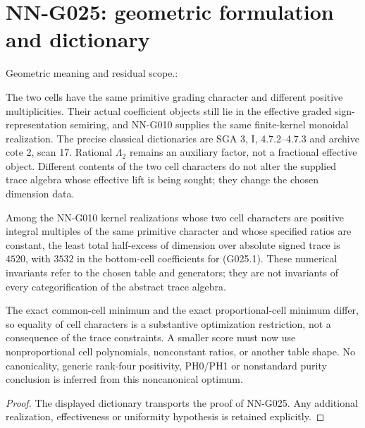 \section{NN-G025: geometric formulation and dictionary}
\begin{geometricstatement}[NN-G025]
Geometric meaning and residual scope.:

The two cells have the same primitive grading character
and different positive multiplicities. Their actual
coefficient objects still lie in the effective graded
sign-representation semiring, and NN-G010 supplies the
same finite-kernel monoidal realization. The precise
classical dictionaries are SGA 3, I, 4.7.2--4.7.3 and
archive cote 2, scan 17. Rational $\Lambda_2$ remains
an auxiliary factor, not a fractional effective object.
Different contents of the two cell characters do not
alter the supplied trace algebra whose effective lift
is being sought; they change the chosen dimension data.

Among the NN-G010 kernel realizations whose two cell characters
are positive integral multiples of the same primitive character
and whose specified ratios are constant, the least total
half-excess of dimension over absolute signed trace is $4520$,
with $3532$ in the bottom-cell coefficients for (G025.1).
These numerical invariants refer to the chosen table and
generators; they are not invariants of every categorification
of the abstract trace algebra.

The exact common-cell minimum and the exact proportional-cell
minimum differ, so equality of cell characters is a
substantive optimization restriction, not a consequence
of the trace constraints. A smaller score must now use
nonproportional cell polynomials, nonconstant ratios,
or another table shape. No canonicality, generic
rank-four positivity, PH0/PH1 or nonstandard purity
conclusion is inferred from this noncanonical optimum.


\end{geometricstatement}
\begin{proof} The displayed dictionary transports the proof of NN-G025. Any additional realization, effectiveness or uniformity hypothesis is retained explicitly.\end{proof}


